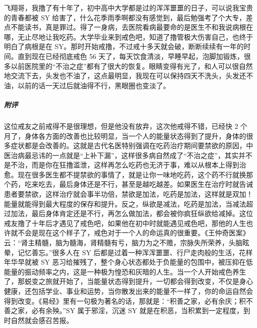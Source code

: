 \begin{case}
    飞翔哥，我撸了有十年了，初中高中大学都是过的浑浑噩噩的日子，可以说我宝贵的青春都被 SY 给害了，什么花季雨季啊都没有感觉到，最后勉强考了个大专，差点不能读书，真是罪过。得了一身病，去医院看病最要命的是医生不和我说病根在哪，无止尽地让我吃药。大学毕业来到戒色吧，知道了撸管极大伤害自己，也终于明白了病根是在 SY。那时开始戒撸，不过戒十多天就会破，断断续续有一年的时间。直到现在已经彻底戒色 56 天了，每天饮食清淡，早睡早起，泡脚加锻炼，很多以前医院里的“不治之症”都有了很大的恢复。眼睛变得有光了，和人可以很自然地交流下去，头发也不油了，这点最明显，我现在可以保持四天不洗头，头发还不油，以前的话一天过后就油得不行，黑眼圈也变淡了。
    \subparagraph{附评} 这位戒友之前戒得不是很理想，但是他没有放弃，这次他戒得不错，已经快 2 个月了，身体各方面的改善也比较明显，当一个人的能量状态得到了提升，身体的很多症状都是会改善的。这就是古代名医特别强调在吃药治疗期间要禁欲的原因，中医治病最忌讳的一点就是“上补下漏”，这样很多病自然成了“不治之症”，其实并不是不治，而是你在狂撸滥泄，这样再怎么吃药也无济于事，难以从根本上得到治愈。现在很多医生都不提禁欲的事情了，就是让你一味地吃药，这个药不行就换那个药，吃来吃去，最后身体还是不行，甚至是越吃越差。如果医生在治疗时就告诫患者要禁欲，这样治疗就会事半功倍，禁欲是加法，吃药是加法，这样就是双加！能量就能得到最大程度的保存和提升。反之，纵欲是减法，吃药是加法，当减法超过加法，最后身体肯定还是不行，再怎么做加法，都会被你疯狂纵欲给减掉。这位戒友撸了十年后才遇见了戒色吧，如果他在初中时就能遇见戒色吧，那他的人生也许就不会是现在这个样子了，戒色对于一个人的命运真的很重要。《王仲奇医案》云：“肾主精髓，脑为髓海，肾精髓有亏，脑力为之不赡，宗脉失所荣养，头脑眩晕，记忆善忘。”很多人在 SY 后都是过着一种浑浑噩噩、行尸走肉般的生活，花样年华早就被 SY 恶习给摧残了，整个身心状态都处于负能量的包围中，被压抑在低能量的振动频率之内，这是一种极为惶恐和灰暗的人生。当一个人开始戒色养生了，那蜕变之旅就开始了，当能量状态得到提升，一切都会得到改变，不仅是身心健康，还包括学业、事业和运势，当你散发出来的能量不一样了，你的命运自然会得到改变。《易经》里有一句极为著名的话，那就是：“积善之家，必有余庆；积不善之家，必有余殃。”SY 属于邪淫，沉迷 SY 就是在积恶，当积累到一定程度，到时自然就会感召苦报。
\end{case}

